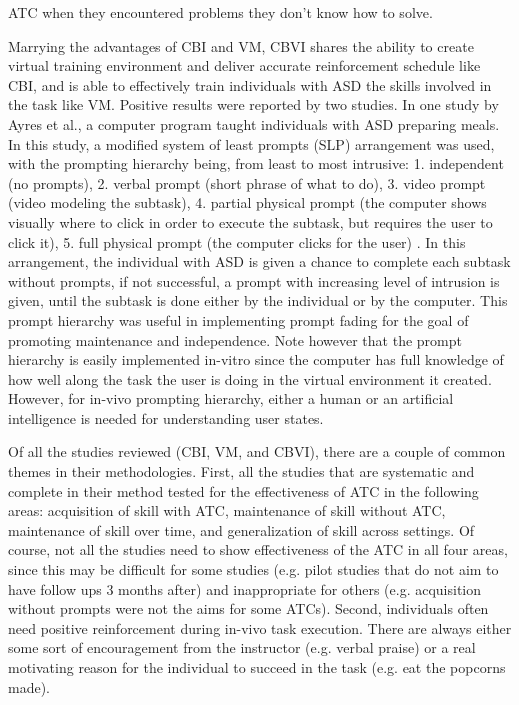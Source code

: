 ATC when they encountered problems they don't know how to solve.

Marrying the advantages of CBI and VM, CBVI shares the ability to create virtual training environment and deliver accurate reinforcement schedule like CBI, and is able to effectively train individuals with ASD the skills involved in the task like VM.  Positive results were reported by two studies.  In one study by Ayres et al., a computer program taught individuals with ASD preparing meals.  In this study, a modified system of least prompts (SLP) arrangement was used, with the prompting hierarchy being, from least to most intrusive: 1. independent (no prompts), 2. verbal prompt (short phrase of what to do), 3. video prompt (video modeling the subtask), 4. partial physical prompt (the computer shows visually where to click in order to execute the subtask, but requires the user to click it), 5. full physical prompt (the computer clicks for the user) \cite{ayres2009acquisition}.  In this arrangement, the individual with ASD is given a chance to complete each subtask without prompts, if not successful, a prompt with increasing level of intrusion is given, until the subtask is done either by the individual or by the computer.  This prompt hierarchy was useful in implementing prompt fading for the goal of promoting maintenance and independence.  Note however that the prompt hierarchy is easily implemented in-vitro since the computer has full knowledge of how well along the task the user is doing in the virtual environment it created.  However, for in-vivo prompting hierarchy, either a human or an artificial intelligence is needed for understanding user states.

Of all the studies reviewed (CBI, VM, and CBVI), there are a couple of common themes in their methodologies.  First, all the studies that are systematic and complete in their method tested for the effectiveness of ATC in the following areas: acquisition of skill with ATC, maintenance of skill without ATC, maintenance of skill over time, and generalization of skill across settings.  Of course, not all the studies need to show effectiveness of the ATC in all four areas, since this may be difficult for some studies (e.g. pilot studies that do not aim to have follow ups 3 months after) and inappropriate for others (e.g. acquisition without prompts were not the aims for some ATCs).  Second, individuals often need positive reinforcement during in-vivo task execution.  There are always either some sort of encouragement from the instructor (e.g. verbal praise) or a real motivating reason for the individual to succeed in the task (e.g. eat the popcorns made).

